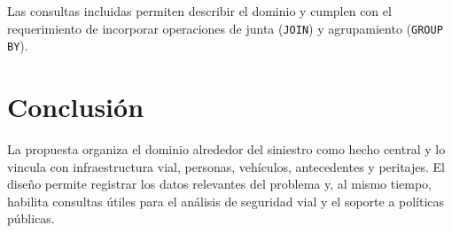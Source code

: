\documentclass[12pt,a4paper]{article}
\begin{document}
Las consultas incluidas permiten describir el dominio y cumplen con el requerimiento de incorporar operaciones de junta (\texttt{JOIN}) y agrupamiento (\texttt{GROUP BY}).

\section{Conclusión}

La propuesta organiza el dominio alrededor del siniestro como hecho central y lo vincula con infraestructura vial, personas, vehículos, antecedentes y peritajes. El diseño permite registrar los datos relevantes del problema y, al mismo tiempo, habilita consultas útiles para el análisis de seguridad vial y el soporte a políticas públicas.
\end{document}
